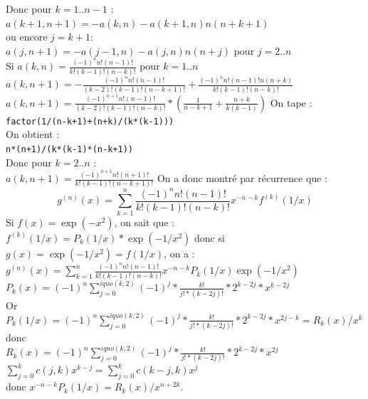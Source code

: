 \documentclass[a4paper,11pt]{book}
\begin{document}
Donc pour $k=1..n-1$ :\\
$a(k+1,n+1)=-a(k,n)-a(k+1,n)n(n+k+1)$\\
ou encore $j=k+1$:\\
$a(j,n+1)=-a(j-1,n)-a(j,n)n(n+j)$ pour $j=2..n$\\
Si $a(k,n)=\frac{(-1)^nn!(n-1)!}{k!(k-1)!(n-k)!}$ pour $k=1..n$\\
$a(k,n+1)=-\frac{(-1)^nn!(n-1)!}{(k-2)!(k-1)!(n-k+1)!}+\frac{(-1)^nn!(n-1)!n(n+k)}{k!(k-1)!(n-k)!}$
$a(k,n+1)=\frac{(-1)^{n+1}n!(n-1)!}{(k-2)!(k-1)!(n-k)!}*(\frac{1}{n-k+1}+\frac{n+k}{k(k-1)})$
On tape :\\
{\tt factor(1/(n-k+1)+(n+k)/(k*(k-1)))}\\
On obtient :\\
{\tt n*(n+1)/(k*(k-1)*(n-k+1))}\\
Donc pour $k=2..n$ :\\
$a(k,n+1)=\frac{(-1)^{n+1}n!(n+1)!}{k!(k-1)!(n-k+1)!}$
On a donc montr\'e par r\'ecurrence que :
$$g^(n)(x)=\sum_{k=1}^n\frac{(-1)^nn!(n-1)!}{k!(k-1)!(n-k)!}x^{-n-k}f^{(k)}(1/x)$$
Si $f(x)=\exp(-x^2)$, on sait que :\\
$f^{(k)}(1/x)=P_k(1/x)*\exp(-1/x^2)$
donc si $g(x)=\exp(-1/x^2)=f(1/x)$, on a :\\
$g^(n)(x)=\sum_{k=1}^n\frac{(-1)^nn!(n-1)!}{k!(k-1)!(n-k)!}x^{-n-k}P_k(1/x)\exp(-1/x^2)$\\
$P_k(x)=(-1)^n\sum_{j=0}^{iquo(k,2)}(-1)^{j}*\frac{k!}{j!*(k-2j)!}*2^{k-2j}*x^{k-2j}$\\
Or $P_k(1/x)=(-1)^n\sum_{j=0}^{iquo(k,2)}(-1)^{j}*\frac{k!}{j!*(k-2j)!}*2^{k-2j}*x^{2j-k}= R_k(x)/x^k$ donc\\
$R_k(x)=(-1)^n\sum_{j=0}^{iquo(k,2)}(-1)^{j}*\frac{k!}{j!*(k-2j)!}*2^{k-2j}*x^{2j}$
\\
$\sum_{j=0}^kc(j,k)x^{k-j}=\sum_{j=0}^kc(k-j,k)x^{j}$\\
donc $x^{-n-k}P_k(1/x)= R_k(x)/x^{n+2k}$.\\
\end{document}
